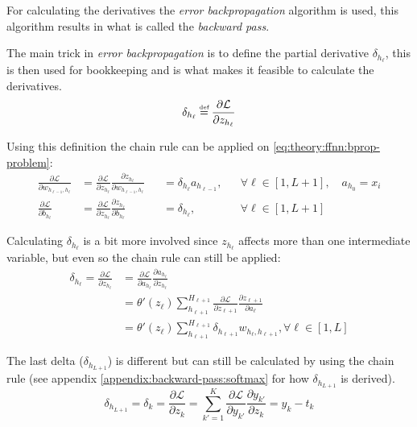 For calculating the derivatives the \textit{error backpropagation} algorithm is used, this algorithm results in what is called the \textit{backward pass}.

The main trick in \textit{error backpropagation} is to define the partial derivative $\delta_{h_\ell}$, this is then used for bookkeeping and is what makes it feasible to calculate the derivatives.
\begin{equation}
\delta_{h_\ell} \defeq \frac{\partial \mathcal{L}}{\partial z_{h_\ell}}
\end{equation}

Using this definition the chain rule can be applied on \eqref{eq:theory:ffnn:bprop-problem}:
\begin{equation}
\begin{aligned}
\frac{\partial \mathcal{L}}{\partial w_{h_{\ell-1}, h_\ell}} &= \frac{\partial \mathcal{L}}{\partial z_{h_\ell}} \frac{\partial z_{h_\ell}}{\partial w_{h_{\ell-1}, h_\ell}} &&= \delta_{h_\ell} a_{h_{\ell-1}},&& \forall \ell \in [1, L+1],\quad a_{h_0} = x_i \\
\frac{\partial \mathcal{L}}{\partial b_{h_\ell}} &= \frac{\partial \mathcal{L}}{\partial z_{h_\ell}} \frac{\partial z_{h_\ell}}{\partial b_{h_\ell}} &&= \delta_{h_\ell},&& \forall \ell \in [1, L+1]
\end{aligned}
\end{equation}


Calculating $\delta_{h_\ell}$ is a bit more involved since $z_{h_\ell}$ affects more than one intermediate variable, but even so the chain rule can still be applied:
\begin{equation}
\begin{aligned}
\delta_{h_\ell} = \frac{\partial \mathcal{L}}{\partial z_{h_\ell}} &= \frac{\partial \mathcal{L}}{\partial a_{h_\ell}} \frac{\partial a_{h_\ell}}{\partial z_{h_\ell}} \\
&= \theta'(z_\ell) \sum_{h_{\ell+1}}^{H_{\ell+1}} \frac{\partial \mathcal{L}}{\partial z_{\ell+1}} \frac{\partial z_{\ell+1}}{\partial a_\ell} \\
&= \theta'(z_\ell) \sum_{h_{\ell+1}}^{H_{\ell+1}} \delta_{h_{\ell+1}} w_{h_\ell, h_{\ell+1}}, \forall \ell \in [1, L]
\end{aligned}
\label{eq:theory:ffnn:bprop}
\end{equation}

The last delta ($\delta_{h_{L+1}}$) is different but can still be calculated by using the chain rule (see appendix \ref{appendix:backward-pass:softmax} for how $\delta_{h_{L+1}}$ is derived).
\begin{equation}
\delta_{h_{L + 1}} = \delta_k = \frac{\partial \mathcal{L}}{\partial z_k} = \sum_{k'=1}^K \frac{\partial \mathcal{L}}{\partial y_{k'}} \frac{\partial y_{k'}}{\partial z_k} = y_k - t_k
\label{eq:theory:ffnn:bprop-delta-last}
\end{equation}

